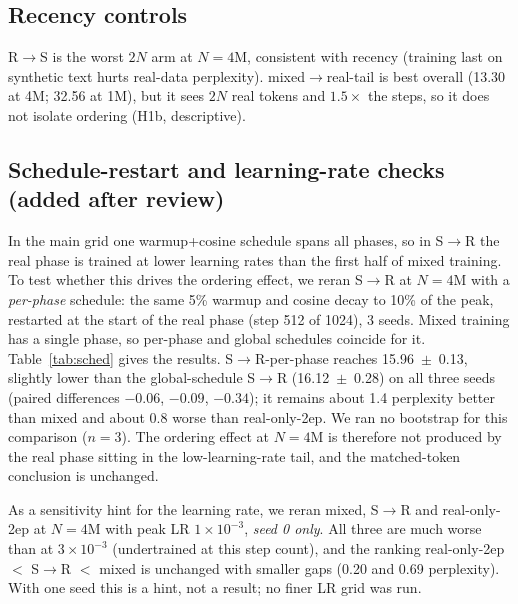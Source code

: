 \documentclass[conference]{IEEEtran}
\newcommand{\SR}{S$\to$R}
\newcommand{\RS}{R$\to$S}
\newcommand{\MRT}{mixed$\to$real-tail}
\begin{document}
\subsection{Recency controls}
\RS{} is the worst $2N$ arm at $N{=}4$M, consistent with recency (training last on synthetic text hurts real-data perplexity). \MRT{} is best overall (13.30 at 4M; 32.56 at 1M), but it sees $2N$ real tokens and $1.5\times$ the steps, so it does not isolate ordering (H1b, descriptive).

\subsection{Schedule-restart and learning-rate checks (added after review)}
\label{sec:sched}
In the main grid one warmup+cosine schedule spans all phases, so in \SR{} the real phase is trained at lower learning rates than the first half of mixed training. To test whether this drives the ordering effect, we reran \SR{} at $N{=}4$M with a \emph{per-phase} schedule: the same 5\% warmup and cosine decay to 10\% of the peak, restarted at the start of the real phase (step 512 of 1024), 3 seeds. Mixed training has a single phase, so per-phase and global schedules coincide for it. Table~\ref{tab:sched} gives the results. \SR-per-phase reaches 15.96~$\pm$~0.13, slightly lower than the global-schedule \SR{} (16.12~$\pm$~0.28) on all three seeds (paired differences $-0.06$, $-0.09$, $-0.34$); it remains about 1.4 perplexity better than mixed and about 0.8 worse than real-only-2ep. We ran no bootstrap for this comparison ($n{=}3$). The ordering effect at $N{=}4$M is therefore not produced by the real phase sitting in the low-learning-rate tail, and the matched-token conclusion is unchanged.

As a sensitivity hint for the learning rate, we reran mixed, \SR{} and real-only-2ep at $N{=}4$M with peak LR $1\times10^{-3}$, \emph{seed 0 only}. All three are much worse than at $3\times10^{-3}$ (undertrained at this step count), and the ranking real-only-2ep $<$ \SR{} $<$ mixed is unchanged with smaller gaps (0.20 and 0.69 perplexity). With one seed this is a hint, not a result; no finer LR grid was run.
\end{document}

